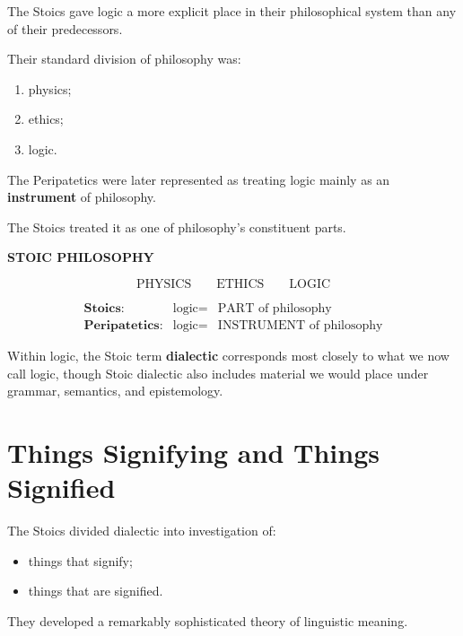 \documentclass[11pt]{article}
\begin{document}
The Stoics gave logic a more explicit place in their philosophical
system than any of their predecessors.

Their standard division of philosophy was:

\begin{enumerate}
    \item physics;
    \item ethics;
    \item logic.
\end{enumerate}

The Peripatetics were later represented as treating logic mainly
as an \textbf{instrument} of philosophy.

The Stoics treated it as one of philosophy's constituent parts.

\begin{whiteboard}
\textbf{STOIC PHILOSOPHY}

\[
\boxed{
\text{PHYSICS}
\qquad
\text{ETHICS}
\qquad
\text{LOGIC}
}
\]

\vspace{0.5em}

\[
\begin{array}{rcl}
\textbf{Stoics:}
&\text{logic}=&
\text{PART of philosophy}
\\[0.4em]
\textbf{Peripatetics:}
&\text{logic}=&
\text{INSTRUMENT of philosophy}
\end{array}
\]
\end{whiteboard}

Within logic, the Stoic term \textbf{dialectic} corresponds most
closely to what we now call logic, though Stoic dialectic also
includes material we would place under grammar, semantics, and
epistemology.

\section{Things Signifying and Things Signified}

The Stoics divided dialectic into investigation of:

\begin{itemize}
    \item things that signify;
    \item things that are signified.
\end{itemize}

They developed a remarkably sophisticated theory of linguistic
meaning.
\end{document}
